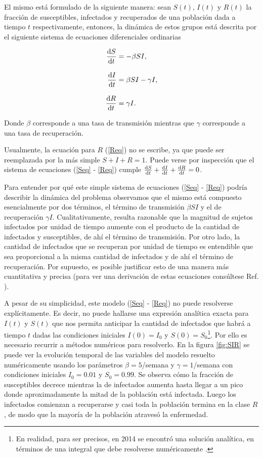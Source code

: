 El mismo está formulado de la siguiente manera: sean $S(t)$, $I(t)$ y $R(t)$ la fracción de susceptibles, infectados
y recuperados de una población dada a tiempo $t$ respectivamente, entonces, la dinámica de estos grupos está descrita por el siguiente sistema de
ecuaciones diferenciales ordinarias

\begin{align}
  \dv{S}{t}&=-\beta SI,\label{Seq}\\[.3cm]
  \dv{I}{t}&=\beta SI - \gamma I,\label{Ieq}\\[.3cm]
  \dv{R}{t}&=\gamma I.\label{Req}
\end{align}


Donde $\beta$ corresponde a una tasa de transmisión mientras que $\gamma$ corresponde a una tasa de recuperación.

Usualmente, la ecuación para $R$ (\ref{Req}) no se escribe, ya que puede ser reemplazada por la más simple $S+I+R=1$. Puede verse por inspección que el sistema de ecuaciones
(\ref{Seq} - \ref{Req}) cumple $\dv{S}{t}+\dv{I}{t}+\dv{R}{t}=0$.

Para entender por qué este simple sistema de ecuaciones (\ref{Seq} - \ref{Req}) podría describir la dinámica del problema observamos que el mismo 
está compuesto esencialmente por dos términos, el término de transmisión $\beta SI$ y el de recuperación $\gamma I$. Cualitativamente, resulta 
razonable que la magnitud de sujetos infectados por unidad de tiempo aumente con el producto de la cantidad de infectados y susceptibles, de ahí 
el término de transmisión. Por otro lado, la cantidad de infectados que se recuperan por unidad de tiempo es entendible que sea proporcional a la
misma cantidad de infectados y de ahí el término de recuperación. Por supuesto, es posible justificar esto de una manera más cuantitativa y precisa (para 
ver una derivación de estas ecuaciones consúltese  Ref. \cite{keeling:infectious_diseases}).

A pesar de su simplicidad, este modelo (\ref{Seq} - \ref{Req}) no puede resolverse explícitamente. Es decir, no puede hallarse una expresión analítica exacta
para $I(t)$ y $S(t)$ que nos permita anticipar la cantidad de infectados que habrá a tiempo $t$ dadas las condiciones iniciales $I(0)=I_0$ y $S(0)=S_0$\footnote{En realidad,
para ser precisos, en 2014 se encontró una solución analítica, en términos de una integral que debe resolverse numéricamente \cite{sir_sol}.}.
Por ello
es necesario recurrir a métodos numéricos para resolverlo. En la figura \ref{fig:SIR} se puede ver la evolución temporal de las variables del modelo 
resuelto numéricamente usando los parámetros $\beta=5$/semana y
$\gamma=1$/semana con condiciones iniciales $I_0=0.01$ y $S_0=0.99$. Se observa cómo la fracción de susceptibles decrece mientras la de infectados 
aumenta hasta llegar a un pico donde aproximadamente la mitad de la población está infectada. Luego los infectados comienzan a recuperarse y casi toda
la población termina en la clase $R$, de modo que la mayoría de la población atravesó la enfermedad.

